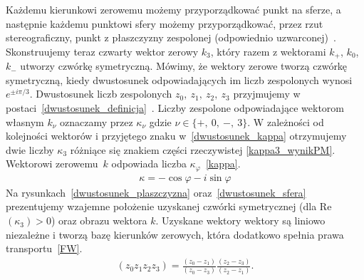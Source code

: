 Każdemu kierunkowi zerowemu możemy przyporządkować punkt na sferze,
a następnie każdemu punktowi sfery możemy przyporządkować,
przez rzut stereograficzny, 
punkt z płaszczyzny zespolonej 
(odpowiednio uzwarconej)~\cite{astar1993algebra}.
Skonstruujemy teraz czwarty wektor zerowy $k_3$, który razem z 
wektorami $k_+$, $k_0$, $k_-$ utworzy czwórkę symetryczną.
Mówimy, że wektory zerowe tworzą czwórkę symetryczną,
 kiedy dwustosunek odpowiadających im liczb zespolonych 
 wynosi $e^{\pm i\pi/3}$.  
Dwustosunek liczb zespolonych $z_0,\ z_1,\ z_2,\ z_3$ przyjmujemy w 
postaci~\eqref{dwustosunek_definicja}~\cite{star1993algebra}.
Liczby zespolone odpowiadające wektorom własnym $k_\nu$ oznaczamy
przez $\kappa_\nu$ gdzie $\nu \in \{+,\ 0,\ -,\ 3\}$.
W zależności od kolejności wektorów i 
przyjętego znaku w~\eqref{dwustosunek_kappa}
otrzymujemy dwie liczby $\kappa_3$ różniące się znakiem części 
rzeczywistej \eqref{kappa3_wynikPM}. 
Wektorowi zerowemu~$k$ odpowiada liczba $\kappa_\varphi$~\eqref{kappa}.
\begin{align}\label{kappa}
\kappa = -\cos\varphi - i \sin \varphi
\end{align}
Na rysunkach~\ref{dwustosunek_plaszczyzna} oraz~\ref{dwustosunek_sfera} 
prezentujemy wzajemne położenie 
uzyskanej czwórki symetrycznej (dla Re$ (\kappa_3) >0$) 
oraz obrazu wektora $k$. 
Uzyskane wektory wektory są liniowo niezależne i tworzą bazę 
kierunków zerowych, która dodatkowo spełnia 
prawa transportu~\eqref{FW}.
\begin{align}\label{dwustosunek_definicja}
(z_0z_1z_2z_3) = 
\frac{(z_0-z_1)}{(z_0-z_3)} 
\frac{(z_2-z_3)}{(z_2 -z_1)} .
\end{align}
